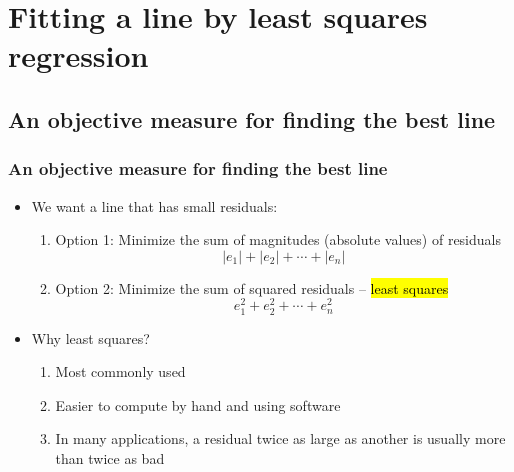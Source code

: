 \documentclass[notes,11pt, aspectratio=169]{beamer}
\begin{document}

\section{Fitting a line by least squares regression}


\subsection{An objective measure for finding the best line}


\begin{frame}
\frametitle{An objective measure for finding the best line}

\begin{itemize}

\item We want a line that has small residuals:
\pause
\begin{enumerate}
\item Option 1: Minimize the sum of magnitudes (absolute values) of residuals
\[ |e_1| + |e_2| + \cdots + |e_n| \]
\pause
\item Option 2: Minimize the sum of squared residuals -- \hl{least squares}
\[ e_1^2 + e_2^2 + \cdots + e_n^2 \]
\end{enumerate}

\pause

\item Why least squares?
\pause
\begin{enumerate}
\item Most commonly used
\pause
\item Easier to compute by hand and using software
\pause
\item In many applications, a residual twice as large as another is usually more than twice as bad
\end{enumerate}

\end{itemize}

\end{frame}

\end{document}
